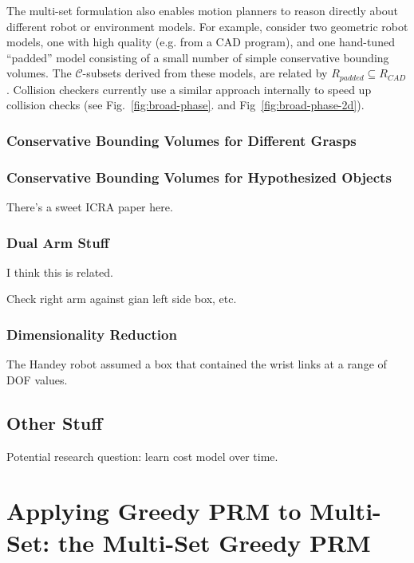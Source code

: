 \documentclass{report}
\begin{document}
The multi-set formulation also enables motion planners to
reason directly about different robot or environment models.
For example, consider two geometric robot models,
one with high quality (e.g. from a CAD program),
and one hand-tuned ``padded'' model consisting of 
a small number of simple conservative bounding volumes.
The $\mathcal{C}$-subsets derived from these models,
are related by $R_{padded} \subseteq R_{CAD}$.
Collision checkers currently use a similar approach internally
to speed up collision checks (see Fig.~\ref{fig:broad-phase}.
and Fig~\ref{fig:broad-phase-2d}).

\subsection{Conservative Bounding Volumes for Different Grasps}

\subsection{Conservative Bounding Volumes for Hypothesized Objects}

There's a sweet ICRA paper here.

\subsection{Dual Arm Stuff}

I think this is related.

Check right arm against gian left side box, etc.

\subsection{Dimensionality Reduction}

The Handey \cite{lozanoperez1987handey} robot
assumed a box that contained the wrist links at a range of DOF values.

\section{Other Stuff}

Potential research question: learn cost model over time.


\newpage
\chapter{Applying Greedy PRM to Multi-Set: the Multi-Set Greedy PRM}
\label{chap:multi-set-prm}
\end{document}
